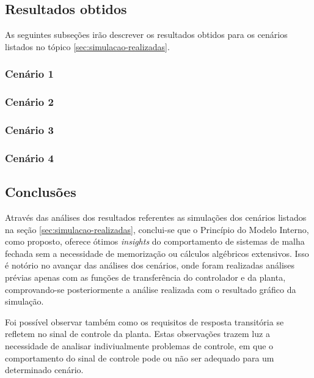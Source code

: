 \subsection{Resultados obtidos}
As seguintes subseções irão descrever os resultados obtidos para os cenários
listados no tópico \ref{sec:simulacao-realizadas}.

\subsubsection{Cenário 1}
\label{subsub:cenario1}


\subsubsection{Cenário 2}
\label{subsub:cenario2}


\subsubsection{Cenário 3}
\label{subsub:cenario3}


\subsubsection{Cenário 4}
\label{subsub:cenario4}


\subsection{Conclusões}
Através das análises dos resultados referentes as simulações dos cenários
listados na seção \ref{sec:simulacao-realizadas}, conclui-se que o Princípio do
Modelo Interno, como proposto, oferece ótimos \textit{insights} do comportamento
de sistemas de malha fechada sem a necessidade de memorização ou cálculos
algébricos extensivos. Isso é notório no avançar das análises dos cenários, onde
foram realizadas análises prévias apenas com as funções de transferência do
controlador e da planta, comprovando-se posteriormente a análise realizada com o
resultado gráfico da simulação.

Foi possível observar também como os requisitos de resposta transitória se
refletem no sinal de controle da planta. Estas observações trazem luz a
necessidade de analisar indiviualmente problemas de controle, em que o
comportamento do sinal de controle pode ou não ser adequado para um determinado
cenário.

